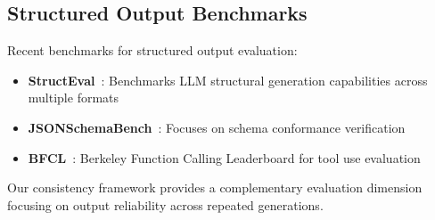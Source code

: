 \documentclass{article}
\begin{document}
\subsection{Structured Output Benchmarks}

Recent benchmarks for structured output evaluation:
\begin{itemize}
    \item \textbf{StructEval}~\cite{yang2025structeval}: Benchmarks LLM structural generation capabilities across multiple formats
    \item \textbf{JSONSchemaBench}~\cite{geng2025generating}: Focuses on schema conformance verification
    \item \textbf{BFCL}~\cite{berkeley2024bfcl}: Berkeley Function Calling Leaderboard for tool use evaluation
\end{itemize}

Our consistency framework provides a complementary evaluation dimension focusing on output reliability across repeated generations.

\end{document}
